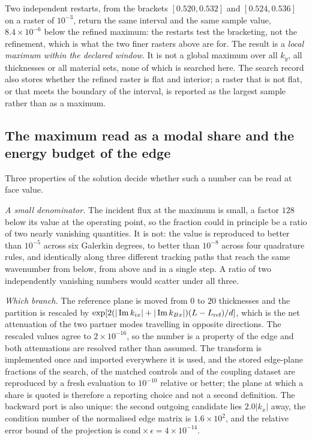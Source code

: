 Two independent restarts, from the brackets $[0.520,0.532]$ and
$[0.524,0.536]$ on a raster of $10^{-3}$, return the same interval and the same
sample value, $8.4\times10^{-6}$ below the refined maximum: the restarts test the
bracketing, not the refinement, which is what the two finer rasters above are
for.  The result is a \emph{local maximum within the declared window}.  It is not a
global maximum over all $k_y$, all thicknesses or all material sets, none of
which is searched here.  The search record also stores whether the refined
raster is flat and interior; a raster that is not flat, or that meets the
boundary of the interval, is reported as the largest sample rather than as a
maximum.

\subsection{The maximum read as a modal share and the energy budget of the edge}
\label{sec:results_artefact}
\label{sec:results_channel}

Three properties of the solution decide whether such a number can be read at
face value.

\emph{A small denominator.}  The incident flux at the maximum is small, a
factor $128$ below its value at the operating point, so the fraction could in
principle be a ratio of two nearly vanishing quantities.  It is not: the value
is reproduced to better than $10^{-5}$ across six Galerkin degrees, to
better than $10^{-8}$ across four quadrature rules, and identically along three
different tracking paths that reach the same wavenumber from below, from above
and in a single step.  A ratio of two independently vanishing numbers would
scatter under all three.

\emph{Which branch.}  The reference plane is moved from $0$ to $20$
thicknesses and the partition is rescaled by
$\exp[2(|\operatorname{Im} k_{ix}|+|\operatorname{Im} k_{Bx}|)(L-L_{\text{ref}})/d]$, which is the net
attenuation of the two partner modes travelling in opposite directions.  The
rescaled values agree to $2\times10^{-16}$, so the number is a property of the
edge and both attenuations are resolved rather than assumed.  The transform is
implemented once and imported everywhere it is used, and the stored edge-plane
fractions of the search, of the matched controls and of the coupling dataset
are reproduced by a fresh evaluation to $10^{-10}$ relative or better; the plane at
which a share is quoted is therefore a reporting choice and not a second
definition.  The backward port
is also unique: the second outgoing candidate lies $2.0|k_x|$ away, the
condition number of the normalised edge matrix is $1.6\times10^{2}$, and the
relative error bound of the projection is $\text{cond}\times\epsilon=4\times10^{-14}$.

